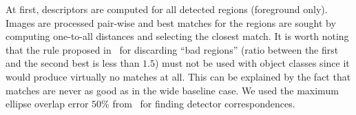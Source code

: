 \documentclass[preprint,authoryear,review]{elsarticle}
\newcommand{\commentNK}[1]{{\bf NK: #1}}
\begin{document}
At first, descriptors are computed for
all detected regions (foreground only). Images are processed
pair-wise and best matches for the regions are sought by computing
one-to-all distances and selecting the closest match. It is worth noting
that the rule proposed in~\cite{Low:2004} for discarding ``bad regions''
(ratio between the first and the second best is less than $1.5$) must
not be used with object classes since it would produce virtually no matches
at all. This can be explained by the fact that matches are
never as good as in the wide baseline case. We used the maximum ellipse
overlap error $50\%$ from~\cite{MikSch:2005} for finding detector correspondences.

\end{document}
